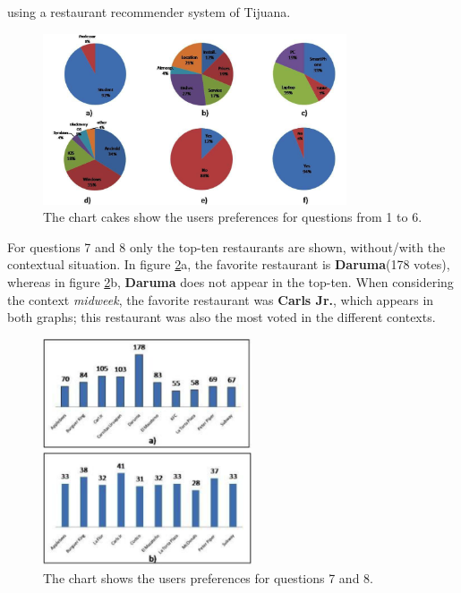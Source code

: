 using a restaurant recommender system of Tijuana.
\begin{figure}
\captionsetup{justification=centering,margin=2cm,font=footnotesize}
\centering
\setlength\fboxsep{0pt}
\includegraphics[width=0.8\textwidth]{img/cakes.png}
\caption{The chart cakes show the users preferences for questions from 1 to 6.}
\label{fig:cakeschart}     
\end{figure}
For questions 7 and 8 only the top-ten restaurants are shown,
without/with the contextual situation. In figure \ref{fig:barschart}a,
the favorite restaurant is \textbf{Daruma}(178 votes),  whereas in
figure \ref{fig:barschart}b, \textbf{Daruma} does not appear in the
top-ten. When considering the context \textit{midweek}, the favorite
restaurant was \textbf{Carls Jr.}, which appears in both graphs; this
restaurant was also the most voted in the different contexts.
\begin{figure}
\captionsetup{justification=centering,margin=2cm,font=footnotesize}
\centering
\setlength\fboxsep{0pt}
\includegraphics[width=0.55\textwidth]{img/bars.png}
\caption{The chart shows the users preferences for questions 7 and 8.}
\label{fig:barschart}     
\end{figure}
